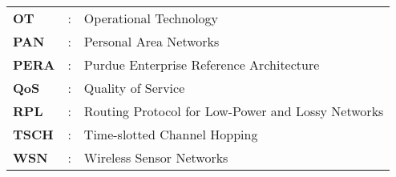 \begin{table}
\begin{spacing}{1.5}
\begin{tabular}{lll}
		\textbf{OT}      & : & Operational Technology                            \\
		\textbf{PAN}     & : & Personal Area Networks                            \\
		\textbf{PERA}    & : & Purdue Enterprise Reference Architecture          \\
		\textbf{QoS}     & : & Quality of Service                                \\
		\textbf{RPL}     & : & Routing Protocol for Low-Power and Lossy Networks \\
		\textbf{TSCH}    & : & Time-slotted Channel Hopping                      \\
		\textbf{WSN}     & : & Wireless Sensor Networks                         
	\end{tabular}
\end{spacing}
\end{table}
